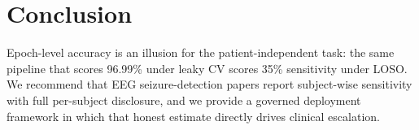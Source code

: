 \documentclass[10pt,journal,twocolumn]{IEEEtran}
\begin{document}
\section{Conclusion}
Epoch-level accuracy is an illusion for the patient-independent task: the same pipeline that scores 96.99\% under leaky CV scores 35\% sensitivity under LOSO. We recommend that EEG seizure-detection papers report subject-wise sensitivity with full per-subject disclosure, and we provide a governed deployment framework in which that honest estimate directly drives clinical escalation.

\small
\end{document}
